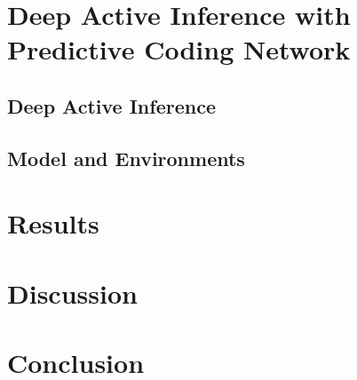 \documentclass{article}
\begin{document}
\section{Deep Active Inference with Predictive Coding Network}

\subsection{Deep Active Inference}

\subsection{Model and Environments}

\section{Results}

\section{Discussion}

\section{Conclusion}



\end{document}
